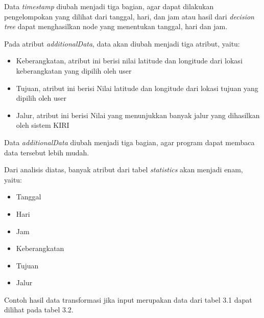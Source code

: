 Data \textsl{timestamp} diubah menjadi tiga bagian, agar dapat dilakukan pengelompokan yang dilihat dari tanggal, hari, dan jam atau hasil dari \textsl{decision tree} dapat menghasilkan node yang menentukan tanggal, hari dan jam.

Pada atribut \textsl{additionalData}, data akan diubah menjadi tiga atribut, yaitu:
\begin{itemize}
	\item Keberangkatan, atribut ini berisi nilai latitude dan longitude dari lokasi keberangkatan yang dipilih oleh user
	\item Tujuan, atribut ini berisi Nilai latitude dan longitude dari lokasi tujuan yang dipilih oleh user
	\item Jalur, atribut ini berisi Nilai yang menunjukkan banyak jalur yang dihasilkan oleh sistem KIRI
\end{itemize}

Data \textsl{additionalData} diubah menjadi tiga bagian, agar program dapat membaca data tersebut lebih mudah.

Dari analisis diatas, banyak atribut dari tabel \textsl{statistics} akan menjadi enam, yaitu:
\begin{itemize}
	\item Tanggal
	\item Hari
	\item Jam
	\item Keberangkatan
	\item Tujuan
	\item Jalur
\end{itemize}

Contoh hasil data transformasi jika input merupakan data dari tabel 3.1 dapat dilihat pada tabel 3.2.

